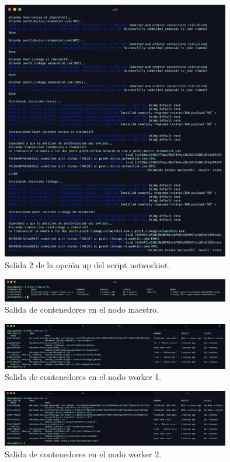 \begin{figure}[ht!]
  \centering
  \includegraphics[width=10cm]{imagenes/desarrollo/comandos/up_2}
  \caption{Salida 2 de la opción up del script networkiot.}
  \label{fig:up-2}
\end{figure}

\begin{figure}[ht!]
  \centering
  \includegraphics[width=10cm]{imagenes/desarrollo/comandos/containers_master}
  \caption{Salida de contenedores en el nodo maestro.}
  \label{fig:containers-master}
\end{figure}

\begin{figure}[ht!]
  \centering
  \includegraphics[width=10cm]{imagenes/desarrollo/comandos/containers_worker1}
  \caption{Salida de contenedores en el nodo worker 1.}
  \label{fig:containers-worker1}
\end{figure}

\begin{figure}[ht!]
  \centering
  \includegraphics[width=10cm]{imagenes/desarrollo/comandos/containers_worker2}
  \caption{Salida de contenedores en el nodo worker 2.}
  \label{fig:containers-worker2}
\end{figure}

